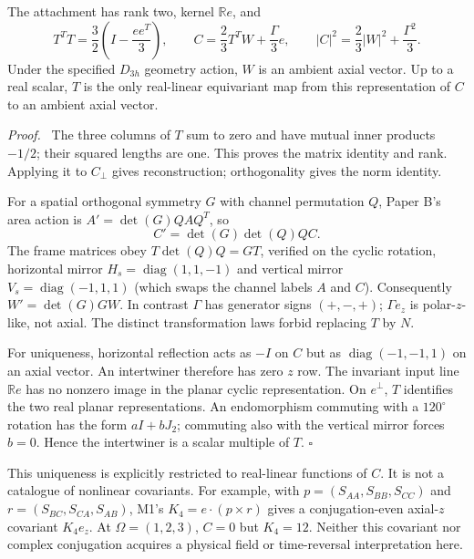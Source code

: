 \documentclass[11pt,a4paper]{article}
\newenvironment{proof}{\par\textit{Proof.}\ }{\hfill$\square$\par}
\newcommand{\R}{\mathbb R}\newcommand{\C}{\mathbb C}\newcommand{\Om}{\Omega}\newcommand{\Fh}{\widehat F}\newcommand{\cof}{\operatorname{cof}}\newcommand{\diag}{\operatorname{diag}}\newcommand{\Argz}{\operatorname{Arg}_0}\newcommand{\iu}{\mathrm i}\newcommand{\dd}{\mathrm d}
\begin{document}
\begin{proposition}\label{prop:attach}
The attachment has rank two, kernel $\R e$, and
\begin{equation}
 T^TT=\frac32\left(I-\frac{ee^T}{3}\right),\qquad
 C=\frac23T^TW+\frac{\Gamma}{3}e,\qquad
 |C|^2=\frac23|W|^2+\frac{\Gamma^2}{3}.\label{eq:reconstruct}
\end{equation}
Under the specified $D_{3h}$ geometry action, $W$ is an ambient axial vector. Up to a real scalar, $T$ is the only real-linear equivariant map from this representation of $C$ to an ambient axial vector.
\end{proposition}
\begin{proof}
The three columns of $T$ sum to zero and have mutual inner products $-1/2$; their squared lengths are one. This proves the matrix identity and rank. Applying it to $C_\perp$ gives reconstruction; orthogonality gives the norm identity.

For a spatial orthogonal symmetry $G$ with channel permutation $Q$, Paper B's area action is $A'=\det(G)QAQ^T$, so
\begin{equation}
 C'=\det(G)\det(Q)QC.\label{eq:Ccov}
\end{equation}
The frame matrices obey $T\det(Q)Q=GT$, verified on the cyclic rotation, horizontal mirror $H_s=\diag(1,1,-1)$ and vertical mirror $V_s=\diag(-1,1,1)$ (which swaps the channel labels $A$ and $C$). Consequently $W'=\det(G)GW$. In contrast $\Gamma$ has generator signs $(+,-,+)$; $\Gamma e_z$ is polar-$z$-like, not axial. The distinct transformation laws forbid replacing $T$ by $N$.

For uniqueness, horizontal reflection acts as $-I$ on $C$ but as $\diag(-1,-1,1)$ on an axial vector. An intertwiner therefore has zero $z$ row. The invariant input line $\R e$ has no nonzero image in the planar cyclic representation. On $e^\perp$, $T$ identifies the two real planar representations. An endomorphism commuting with a $120^\circ$ rotation has the form $aI+bJ_2$; commuting also with the vertical mirror forces $b=0$. Hence the intertwiner is a scalar multiple of $T$.
\end{proof}

This uniqueness is explicitly restricted to real-linear functions of $C$. It is not a catalogue of nonlinear covariants. For example, with $p=(S_{AA},S_{BB},S_{CC})$ and $r=(S_{BC},S_{CA},S_{AB})$, M1's $K_4=e\cdot(p\times r)$ gives a conjugation-even axial-$z$ covariant $K_4e_z$. At $\Om=(1,2,3)$, $C=0$ but $K_4=12$. Neither this covariant nor complex conjugation acquires a physical field or time-reversal interpretation here.
\end{document}
